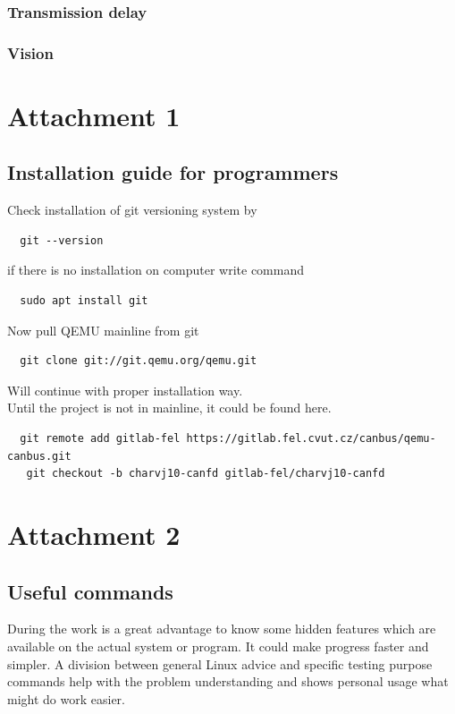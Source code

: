 \documentclass{ctuthesis}
\begin{document}
 \subsection{Transmission delay}
 
 \subsection{Vision}

\chapter{Attachment 1}
 
 \section{Installation guide for programmers}
  Check installation of git versioning system by
  \begin{verbatim}  git --version\end{verbatim}
  if there is no installation on computer write command
  \begin{verbatim}  sudo apt install git\end{verbatim}
  Now pull QEMU mainline from git
 \begin{verbatim}  git clone git://git.qemu.org/qemu.git\end{verbatim}
  Will continue with proper installation way. \\
  Until the project is not in mainline, it could be found here.
  \begin{verbatim}  git remote add gitlab-fel https://gitlab.fel.cvut.cz/canbus/qemu-canbus.git
   git checkout -b charvj10-canfd gitlab-fel/charvj10-canfd\end{verbatim}

\chapter{Attachment 2}

 \section{Useful commands}
  During the work is a great advantage to know some hidden features which are available on the actual system or program. It could make progress faster and simpler. A division between general Linux advice and specific testing purpose commands help with the problem understanding and shows personal usage what might do work easier.
\end{document}
